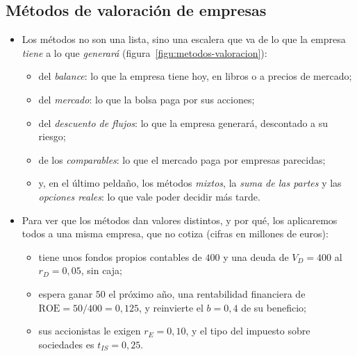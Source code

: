 \documentclass[11pt]{article}
\begin{document}
\subsection{Métodos de valoración de empresas}\label{sec:metodos-valoracion}

\begin{itemize}
\item Los métodos no son una lista, sino una escalera que va de lo que la empresa \emph{tiene} a lo que \emph{generará}\nocite{Fernandez2008Metodos,Damodaran2012Investment} (figura~\ref{figu:metodos-valoracion}):
  \begin{itemize}
  \item del \emph{balance}: lo que la empresa tiene hoy, en libros o a precios de mercado;
  \item del \emph{mercado}: lo que la bolsa paga por sus acciones;
  \item del \emph{descuento de flujos}: lo que la empresa generará, descontado a su riesgo;
  \item de los \emph{comparables}: lo que el mercado paga por empresas parecidas;
  \item y, en el último peldaño, los métodos \emph{mixtos}, la \emph{suma de las partes} y las \emph{opciones reales}: lo que vale poder decidir más tarde.
  \end{itemize}
\end{itemize}

\begin{infografia}[H]
\centering
\caption{La escalera de los métodos de valoración: de lo que la empresa tiene a lo que generará}\label{figu:metodos-valoracion}
\end{infografia}

\begin{itemize}
\item Para ver que los métodos dan valores distintos, y por qué, los aplicaremos todos a una misma empresa, que no cotiza (cifras en millones de euros):
  \begin{itemize}
  \item tiene unos fondos propios contables de $400$ y una deuda de $V_D=400$ al $r_D=0{,}05$, sin caja;
  \item espera ganar $50$ el próximo año, una rentabilidad financiera de $\mathrm{ROE}=50/400=0{,}125$, y reinvierte el $b=0{,}4$ de su beneficio;
  \item sus accionistas le exigen $r_E=0{,}10$, y el tipo del impuesto sobre sociedades es $t_{IS}=0{,}25$.
  \end{itemize}
\end{itemize}
\end{document}
